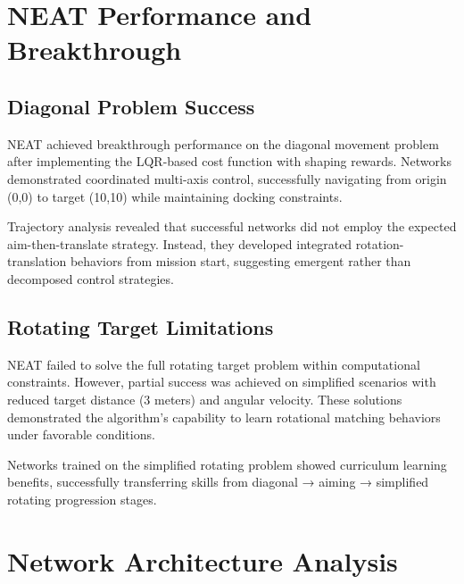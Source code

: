 \section{NEAT Performance and Breakthrough}

\subsection{Diagonal Problem Success}

NEAT achieved breakthrough performance on the diagonal movement problem after implementing the LQR-based cost function with shaping rewards. Networks demonstrated coordinated multi-axis control, successfully navigating from origin (0,0) to target (10,10) while maintaining docking constraints.

Trajectory analysis revealed that successful networks did not employ the expected aim-then-translate strategy. Instead, they developed integrated rotation-translation behaviors from mission start, suggesting emergent rather than decomposed control strategies.


\subsection{Rotating Target Limitations}

NEAT failed to solve the full rotating target problem within computational constraints. However, partial success was achieved on simplified scenarios with reduced target distance (3 meters) and angular velocity. These solutions demonstrated the algorithm's capability to learn rotational matching behaviors under favorable conditions.

Networks trained on the simplified rotating problem showed curriculum learning benefits, successfully transferring skills from diagonal → aiming → simplified rotating progression stages.


\section{Network Architecture Analysis}

